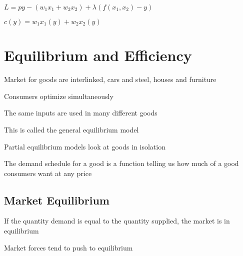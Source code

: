 \documentclass[12pt]{article}
\begin{document}
$L = py - (w_{1}x_{1} + w_{2}x_{2}) + \lambda(f(x_{1}, x_{2}) - y)$

$c(y) = w_{1}x_{1}(y) + w_{2}x_{2}(y)$

\section{Equilibrium and Efficiency}

Market for goods are interlinked, cars and steel, houses and furniture

Consumers optimize simultaneously

The same inputs are used in many different goods

This is called the general equilibrium model

Partial equilibrium models look at goods in isolation

The demand schedule for a good is a function telling us how much of a good consumers want at any price 

\subsection{Market Equilibrium}

If the quantity demand is equal to the quantity supplied, the market is in equilibrium

Market forces tend to push to equilibrium
\end{document}
